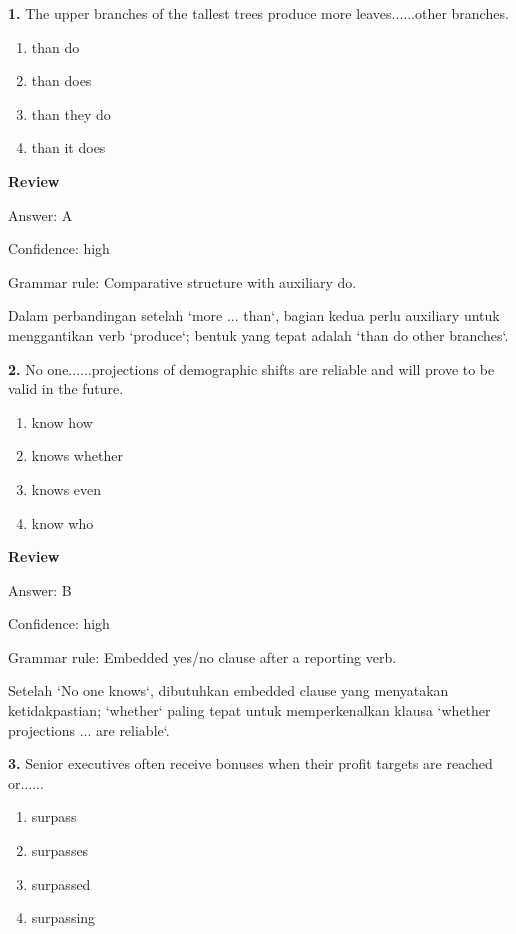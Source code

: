 \documentclass[12pt]{article}
\begin{document}
\noindent\textbf{1.} The upper branches of the tallest trees produce more leaves......other branches.
\begin{enumerate}[label=(\Alph*),leftmargin=*,itemsep=0.2em]
\item than do
\item than does
\item than they do
\item than it does
\end{enumerate}
\par
\begingroup
\setlength{\parskip}{0pt}
\setlength{\parindent}{0pt}
\textbf{Review}\par
Answer: A\par
Confidence: high\par
Grammar rule: Comparative structure with auxiliary do.\par
Dalam perbandingan setelah `more ... than`, bagian kedua perlu auxiliary untuk menggantikan verb `produce`; bentuk yang tepat adalah `than do other branches`.\par
\endgroup
\par
\vspace{0.25\baselineskip}
\noindent\textbf{2.} No one......projections of demographic shifts are reliable and will prove to be valid in the future.
\begin{enumerate}[label=(\Alph*),leftmargin=*,itemsep=0.2em]
\item know how
\item knows whether
\item knows even
\item know who
\end{enumerate}
\par
\begingroup
\setlength{\parskip}{0pt}
\setlength{\parindent}{0pt}
\textbf{Review}\par
Answer: B\par
Confidence: high\par
Grammar rule: Embedded yes/no clause after a reporting verb.\par
Setelah `No one knows`, dibutuhkan embedded clause yang menyatakan ketidakpastian; `whether` paling tepat untuk memperkenalkan klausa `whether projections ... are reliable`.\par
\endgroup
\par
\vspace{0.25\baselineskip}
\noindent\textbf{3.} Senior executives often receive bonuses when their profit targets are reached or......
\begin{enumerate}[label=(\Alph*),leftmargin=*,itemsep=0.2em]
\item surpass
\item surpasses
\item surpassed
\item surpassing
\end{enumerate}
\end{document}
